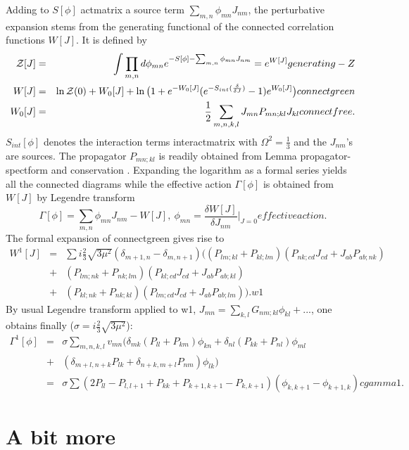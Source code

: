 \documentclass[10pt]{book}
\theoremstyle{break}
\begin{document}
Adding to $S[\phi]$ {actmatrix} a source term $\sum_{m,n}\phi_{mn}J_{nm}$, the perturbative expansion stems from the generating functional of the connected correlation functions $W[J]$. It is defined by 
\begin{eqnarray}
{\cal{Z}}[J]&=&\int\prod_{m,n}d\phi_{mn}e^{-S[\phi]-\sum_{m,n}\phi_{mn}J_{nm}}=e^{W[J]}{generating-Z}\\
W[J]&=&\ln{\cal{Z}}(0)+W_0[J]+\ln\big(1+e^{-W_0[J]} ( e^{ -S_{int}(\frac{\delta}{\delta J})}   -1)e^{W_0[J]} \big){connectgreen}\\
W_0[J]&=&\frac{1}{2}\sum_{m,n,k,l}J_{mn}P_{mn;kl}J_{kl}{connectfree}.
\end{eqnarray}
$S_{int}[\phi]$ denotes the interaction terms interactmatrix with $\Omega^2=\frac{1}{3}$ and the $J_{nm}$'s are sources. The propagator  $P_{mn;kl}$ is readily obtained from Lemma {propagator-spectform} and {conservation} . Expanding the logarithm as a formal series yields all the connected diagrams while the effective action $\Gamma[\phi]$ is  obtained from $W[J]$ by Legendre transform
\begin{equation}
\Gamma[\phi]=\sum_{m,n}\phi_{mn}J_{nm}-W[J],\ \phi_{mn}=\frac{\delta W[J]}{\delta J_{nm}}\vert_{J=0}{effectiveaction}.
\end{equation}
The formal expansion of {connectgreen} gives rise to
\begin{eqnarray}
W^{1}[J]&=& \sum i\frac{2}{3}{\sqrt{3\mu^2}}(\delta_{m+1,n}-\delta_{m,n+1})\big((P_{lm;kl}+P_{kl;lm})(P_{nk;cd}J_{cd}+J_{ab}P_{ab;nk})\nonumber\\
&+&(P_{lm;nk}+P_{nk;lm})(P_{kl;cd}J_{cd}+J_{ab}P_{ab;kl})\nonumber\\
&+&(P_{kl;nk}+P_{nk;kl})(P_{lm;cd}J_{cd}+J_{ab}P_{ab;lm}) \big).{w1}
\end{eqnarray}
By usual Legendre transform applied to {w1}, $J_{mn}=\sum_{k,l}G_{nm;kl}\phi_{kl}+...$, one obtains finally ($\sigma=i\frac{2}{3}{\sqrt{3\mu^2}}$):
\begin{eqnarray}
\Gamma^1[\phi]&=&\sigma\sum_{m,n,k,l} v_{mn}\big(\delta_{mk}(P_{ll}+P_{km})\phi_{kn} +\delta_{nl}(P_{kk}+P_{nl})\phi_{ml}\nonumber\\
&+&(\delta_{m+l,n+k}P_{lk}+\delta_{n+k,m+l}P_{nm})\phi_{lk} \big)\nonumber\\
&=&\sigma\sum(2P_{ll}-P_{l,l+1}+P_{kk}+P_{k+1,k+1}-P_{k,k+1})(\phi_{k,k+1}-\phi_{k+1,k}){cgamma1}.
\end{eqnarray}



\section{A bit more}
\end{document}
